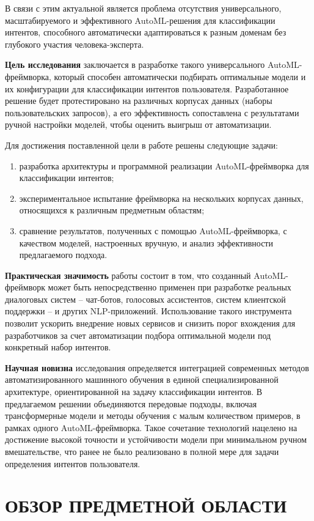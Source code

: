 \documentclass[14pt,a4paper,oneside,openany]{book}
\begin{document}
В связи с этим актуальной является проблема отсутствия универсального, масштабируемого и эффективного AutoML-решения для классификации интентов, способного автоматически адаптироваться к разным доменам без глубокого участия человека-эксперта.

\textbf{Цель исследования} заключается в разработке такого универсального AutoML-фреймворка, который способен автоматически подбирать оптимальные модели и их конфигурации для классификации интентов пользователя. Разработанное решение будет протестировано на различных корпусах данных (наборы пользовательских запросов), а его эффективность сопоставлена с результатами ручной настройки моделей, чтобы оценить выигрыш от автоматизации.

Для достижения поставленной цели в работе решены следующие задачи:
\begin{enumerate}
\item разработка архитектуры и программной реализации AutoML-фреймворка для классификации интентов;
\item экспериментальное испытание фреймворка на нескольких корпусах данных, относящихся к различным предметным областям;
\item сравнение результатов, полученных с помощью AutoML-фреймворка, с качеством моделей, настроенных вручную, и анализ эффективности предлагаемого подхода.
\end{enumerate}

\textbf{Практическая значимость} работы состоит в том, что созданный AutoML-фреймворк может быть непосредственно применен при разработке реальных диалоговых систем – чат-ботов, голосовых ассистентов, систем клиентской поддержки – и других NLP-приложений. Использование такого инструмента позволит ускорить внедрение новых сервисов и снизить порог вхождения для разработчиков за счет автоматизации подбора оптимальной модели под конкретный набор интентов.

\textbf{Научная новизна} исследования определяется интеграцией современных методов автоматизированного машинного обучения в единой специализированной архитектуре, ориентированной на задачу классификации интентов. В предлагаемом решении объединяются передовые подходы, включая трансформерные модели и методы обучения с малым количеством примеров, в рамках одного AutoML-фреймворка. Такое сочетание технологий нацелено на достижение высокой точности и устойчивости модели при минимальном ручном вмешательстве, что ранее не было реализовано в полной мере для задачи определения интентов пользователя.
\chapter{ОБЗОР ПРЕДМЕТНОЙ ОБЛАСТИ}
\label{sec:org5cd0b2a}
\end{document}
